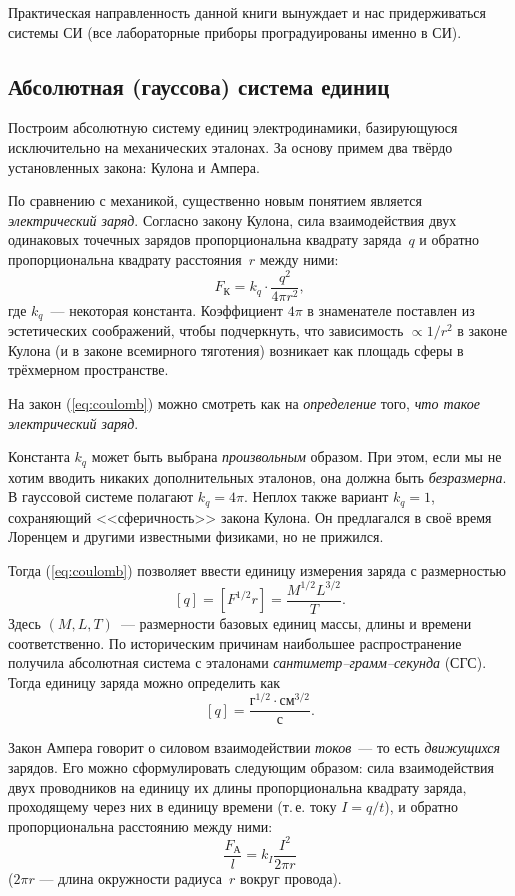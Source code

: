 Практическая направленность данной книги вынуждает и нас придерживаться
системы СИ (все лабораторные приборы проградуированы именно в СИ).

\subsection*{Абсолютная (гауссова) система единиц}

Построим абсолютную систему единиц электродинамики, базирующуюся исключительно
на механических эталонах. За основу примем два твёрдо установленных
закона: Кулона и Ампера.

По сравнению с механикой, существенно новым понятием является \emph{электрический
заряд}. Согласно закону Кулона, сила взаимодействия двух одинаковых
точечных зарядов пропорциональна квадрату заряда~$q$ и обратно пропорциональна
квадрату расстояния~$r$ между ними:
\begin{equation}
F_{\text{К}}=k_{q}\cdot\frac{q^{2}}{4\pi r^{2}},\label{eq:coulomb}
\end{equation}
где $k_{q}$~--- некоторая константа. Коэффициент $4\pi$ в знаменателе
поставлен из эстетических соображений,
чтобы подчеркнуть, что зависимость $\propto1/r^{2}$ в законе Кулона
(и в законе всемирного тяготения) возникает как площадь сферы в трёхмерном
пространстве.

На закон (\ref{eq:coulomb}) можно смотреть как на \emph{определение}
того, \emph{что такое электрический заряд}.

Константа $k_{q}$ может быть выбрана \emph{произвольным} образом.
При этом, если мы не хотим вводить никаких дополнительных эталонов,
она должна быть \emph{безразмерна}. В гауссовой системе
полагают $k_{q}=4\pi$. Неплох также вариант $k_{q}=1$, сохраняющий
<<сферичность>> закона Кулона. Он предлагался в своё время
Лоренцем и другими известными физиками, но не прижился.

Тогда (\ref{eq:coulomb}) позволяет ввести единицу измерения заряда
с размерностью
\[
\left[q\right]=\left[F^{1/2}r\right]=\frac{M^{1/2}L^{3/2}}{T}.
\]
Здесь $\left(M,L,T\right)$~--- размерности базовых единиц массы,
длины и времени соответственно. По историческим причинам наибольшее
распространение получила абсолютная система с эталонами \emph{сантиметр--грамм--секунда}
(СГС). Тогда единицу заряда можно определить как
\[
\left[q\right]=\frac{\text{г}^{1/2}\cdot\text{см}^{3/2}}{\text{с}}.
\]

Закон Ампера говорит о силовом взаимодействии \emph{токов}~--- то
есть \emph{движущихся} зарядов. Его можно сформулировать следующим
образом: сила взаимодействия двух проводников на единицу их длины
пропорциональна квадрату заряда, проходящему через них в единицу времени
(т.\,е. току $I=q/t$), и обратно пропорциональна расстоянию между ними:
\begin{equation}
\frac{F_{\text{А}}}{l}=k_{I}\frac{I^{2}}{2\pi r}\label{eq:ampere}
\end{equation}
($2\pi r$ --- длина окружности радиуса~$r$ вокруг провода).

